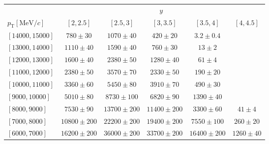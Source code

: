 \renewcommand{\arraystretch}{1.0}
\begin{tabular}{lr@{\hskip+0.2em}c@{\hskip+0.2em}r@{\hskip+0.2em}c@{\hskip+0.2em}rr@{\hskip+0.2em}c@{\hskip+0.2em}r@{\hskip+0.2em}c@{\hskip+0.2em}rr@{\hskip+0.2em}c@{\hskip+0.2em}r@{\hskip+0.2em}c@{\hskip+0.2em}rr@{\hskip+0.2em}c@{\hskip+0.2em}r@{\hskip+0.2em}c@{\hskip+0.2em}rr@{\hskip+0.2em}c@{\hskip+0.2em}r@{\hskip+0.2em}c@{\hskip+0.2em}r}
\toprule&\multicolumn{25}{c}{$y$}\\
$p_{\text{T}} [\text{MeV}/c]$ & \multicolumn{5}{c}{$[2,2.5]$} & \multicolumn{5}{c}{$[2.5,3]$} & \multicolumn{5}{c}{$[3,3.5]$} & \multicolumn{5}{c}{$[3.5,4]$} & \multicolumn{5}{c}{$[4,4.5]$} \\
\midrule$[14000,15000]$ & \multicolumn{5}{c}{$780 \pm 30$} & \multicolumn{5}{c}{$1070 \pm 40$} & \multicolumn{5}{c}{$420 \pm 20$} & \multicolumn{5}{c}{$3.2 \pm 0.4$} & \multicolumn{5}{c}{ } \\
$[13000,14000]$ & \multicolumn{5}{c}{$1110 \pm 40$} & \multicolumn{5}{c}{$1590 \pm 40$} & \multicolumn{5}{c}{$760 \pm 30$} & \multicolumn{5}{c}{$13 \pm 2$} & \multicolumn{5}{c}{ } \\
$[12000,13000]$ & \multicolumn{5}{c}{$1600 \pm 40$} & \multicolumn{5}{c}{$2380 \pm 50$} & \multicolumn{5}{c}{$1280 \pm 40$} & \multicolumn{5}{c}{$61 \pm 4$} & \multicolumn{5}{c}{ } \\
$[11000,12000]$ & \multicolumn{5}{c}{$2380 \pm 50$} & \multicolumn{5}{c}{$3570 \pm 70$} & \multicolumn{5}{c}{$2330 \pm 50$} & \multicolumn{5}{c}{$190 \pm 20$} & \multicolumn{5}{c}{ } \\
$[10000,11000]$ & \multicolumn{5}{c}{$3360 \pm 60$} & \multicolumn{5}{c}{$5450 \pm 80$} & \multicolumn{5}{c}{$3910 \pm 70$} & \multicolumn{5}{c}{$490 \pm 30$} & \multicolumn{5}{c}{ } \\
$[9000,10000]$ & \multicolumn{5}{c}{$5010 \pm 80$} & \multicolumn{5}{c}{$8730 \pm 100$} & \multicolumn{5}{c}{$6820 \pm 90$} & \multicolumn{5}{c}{$1390 \pm 40$} & \multicolumn{5}{c}{ } \\
$[8000,9000]$ & \multicolumn{5}{c}{$7530 \pm 90$} & \multicolumn{5}{c}{$13700 \pm 200$} & \multicolumn{5}{c}{$11400 \pm 200$} & \multicolumn{5}{c}{$3300 \pm 60$} & \multicolumn{5}{c}{$41 \pm 4$} \\
$[7000,8000]$ & \multicolumn{5}{c}{$10800 \pm 200$} & \multicolumn{5}{c}{$22200 \pm 200$} & \multicolumn{5}{c}{$19400 \pm 200$} & \multicolumn{5}{c}{$7550 \pm 100$} & \multicolumn{5}{c}{$260 \pm 20$} \\
$[6000,7000]$ & \multicolumn{5}{c}{$16200 \pm 200$} & \multicolumn{5}{c}{$36000 \pm 200$} & \multicolumn{5}{c}{$33700 \pm 200$} & \multicolumn{5}{c}{$16400 \pm 200$} & \multicolumn{5}{c}{$1260 \pm 40$} \\

\end{tabular}

